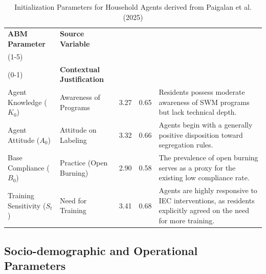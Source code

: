 \begin{table}[h]
    \centering
    \caption{Initialization Parameters for Household Agents derived from Paigalan et al. (2025)}
    \label{tab:initialization_parameters}
    \small
    
    \renewcommand{\arraystretch}{1.15} 
    
    \begin{tabularx}{\textwidth}{ 
        >{\raggedright\arraybackslash}p{2.8cm} 
        >{\raggedright\arraybackslash}p{3.2cm} 
        c 
        c 
        >{\raggedright\arraybackslash}X 
    }
        \toprule
        \textbf{ABM Parameter} & 
        \textbf{Source Variable} & 
        \makecell{\textbf{Mean} \\ (1-5)} & 
        \makecell{\textbf{Norm.} \\ (0-1)} & 
        \textbf{Contextual Justification} \\
        \midrule
        Agent Knowledge ($K_0$) & 
        Awareness of Programs & 
        3.27 & 
        0.65 & 
        Residents possess moderate awareness of SWM programs but lack technical depth. \\
        \midrule
        Agent Attitude ($A_0$) & 
        Attitude on Labeling & 
        3.32 & 
        0.66 & 
        Agents begin with a generally positive disposition toward segregation rules. \\
        \midrule
        Base Compliance ($B_0$) & 
        Practice (Open Burning) & 
        2.90 & 
        0.58 & 
        The prevalence of open burning serves as a proxy for the existing low compliance rate. \\
        \midrule
        Training Sensitivity ($S_t$) & 
        Need for Training & 
        3.41 & 
        0.68 & 
        Agents are highly responsive to IEC interventions, as residents explicitly agreed on the need for more training. \\
        \bottomrule
    \end{tabularx}
\end{table}

\subsection{Socio-demographic and Operational Parameters}


